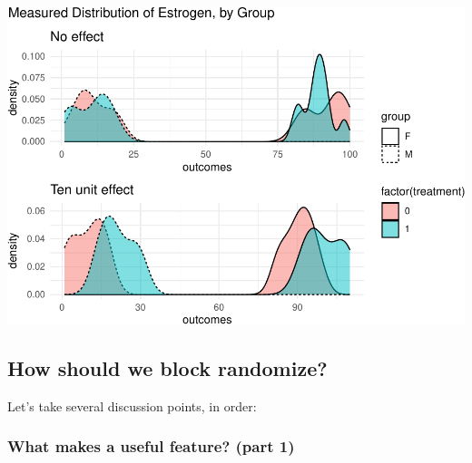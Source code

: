\documentclass[
]{article}
\begin{document}
\includegraphics{241-live-session_files/figure-latex/unnamed-chunk-2-1.pdf}

\hypertarget{how-should-we-block-randomize}{%
\subsection{How should we block randomize?}\label{how-should-we-block-randomize}}

Let's take several discussion points, in order:

\hypertarget{what-makes-a-useful-feature-part-1}{%
\subsubsection{What makes a useful feature? (part 1)}\label{what-makes-a-useful-feature-part-1}}
\end{document}
